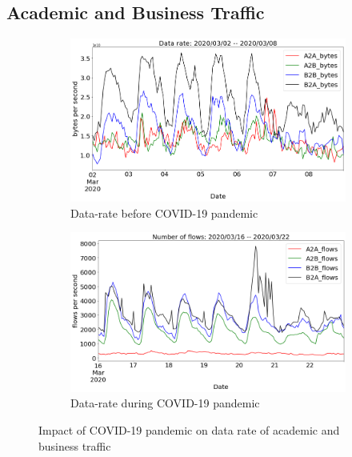 \documentclass[10pt, journal, letterpaper]{IEEEtran}
\newcommand\linearFigSze{0.48}
\begin{document}
\subsection{Academic and Business Traffic}
\begin{figure}
    \begin{subfigure}{\linearFigSze\textwidth}
          \centering
          \includegraphics[width=\columnwidth]{img/BCO2_acaBus_bps.png}
          \caption{Data-rate before COVID-19 pandemic}
          \label{fig:BCO2_acaBus_bps}
    \end{subfigure}
    \begin{subfigure}{\linearFigSze\textwidth}
          \centering
          \includegraphics[width=\columnwidth]{img/CO2_acaBus_bps.png}
          \caption{Data-rate during COVID-19 pandemic}
          \label{fig:CO2_acaBus_bps}
    \end{subfigure}
    \caption{Impact of COVID-19 pandemic on data rate of academic and business traffic}
    \label{fig:datarate_acaBus_BCO_CO}
\end{figure}
\end{document}
